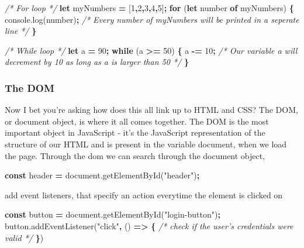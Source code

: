 \documentclass[
]{article}
\newenvironment{Shaded}{\begin{snugshade}}{\end{snugshade}}
\newcommand{\AttributeTok}[1]{\textcolor[rgb]{0.77,0.63,0.00}{#1}}
\newcommand{\CommentTok}[1]{\textcolor[rgb]{0.56,0.35,0.01}{\textit{#1}}}
\newcommand{\ControlFlowTok}[1]{\textcolor[rgb]{0.13,0.29,0.53}{\textbf{#1}}}
\newcommand{\DecValTok}[1]{\textcolor[rgb]{0.00,0.00,0.81}{#1}}
\newcommand{\KeywordTok}[1]{\textcolor[rgb]{0.13,0.29,0.53}{\textbf{#1}}}
\newcommand{\NormalTok}[1]{#1}
\newcommand{\OperatorTok}[1]{\textcolor[rgb]{0.81,0.36,0.00}{\textbf{#1}}}
\newcommand{\StringTok}[1]{\textcolor[rgb]{0.31,0.60,0.02}{#1}}
\newcommand{\VariableTok}[1]{\textcolor[rgb]{0.00,0.00,0.00}{#1}}
\begin{document}
\begin{Shaded}
\begin{Highlighting}[]
\CommentTok{/* For loop */}
\KeywordTok{let}\NormalTok{ myNumbers }\OperatorTok{=}\NormalTok{ [}\DecValTok{1}\OperatorTok{,}\DecValTok{2}\OperatorTok{,}\DecValTok{3}\OperatorTok{,}\DecValTok{4}\OperatorTok{,}\DecValTok{5}\NormalTok{]}\OperatorTok{;}
\ControlFlowTok{for}\NormalTok{ (}\KeywordTok{let}\NormalTok{ number }\KeywordTok{of}\NormalTok{ myNumbers) }\OperatorTok{\{}
  \VariableTok{console}\NormalTok{.}\AttributeTok{log}\NormalTok{(number)}\OperatorTok{;} \CommentTok{/* Every number of myNumbers will be printed in a seperate line */}
\OperatorTok{\}}

\CommentTok{/* While loop */}
\KeywordTok{let}\NormalTok{ a }\OperatorTok{=} \DecValTok{90}\OperatorTok{;}
\ControlFlowTok{while}\NormalTok{ (a }\OperatorTok{>=} \DecValTok{50}\NormalTok{) }\OperatorTok{\{}
\NormalTok{  a }\OperatorTok{-=} \DecValTok{10}\OperatorTok{;}  \CommentTok{/* Our variable a will decrement by 10 as long as a is larger than 50 */}
\OperatorTok{\}}
\end{Highlighting}
\end{Shaded}

\hypertarget{the-dom}{%
\subsubsection*{The DOM}\label{the-dom}}

Now I bet you're asking how does this all link up to HTML and CSS? The DOM, or document object, is where it all comes together. The DOM is the most important object in JavaScript - it's the JavaScript representation of the structure of our HTML and is present in the variable document, when we load the page. Through the dom we can search through the document object,

\begin{Shaded}
\begin{Highlighting}[]
\KeywordTok{const}\NormalTok{ header }\OperatorTok{=} \VariableTok{document}\NormalTok{.}\AttributeTok{getElementById}\NormalTok{(}\StringTok{"header"}\NormalTok{)}\OperatorTok{;}
\end{Highlighting}
\end{Shaded}

add event listeners, that specify an action everytime the element is clicked on

\begin{Shaded}
\begin{Highlighting}[]
\KeywordTok{const}\NormalTok{ button }\OperatorTok{=} \VariableTok{document}\NormalTok{.}\AttributeTok{getElementById}\NormalTok{(}\StringTok{"login-button"}\NormalTok{)}\OperatorTok{;}
\VariableTok{button}\NormalTok{.}\AttributeTok{addEventListener}\NormalTok{(}\StringTok{"click"}\OperatorTok{,}\NormalTok{ () }\KeywordTok{=>} \OperatorTok{\{}
  \CommentTok{/* check if the user's credentials were valid */}
\OperatorTok{\}}\NormalTok{)}
\end{Highlighting}
\end{Shaded}
\end{document}
